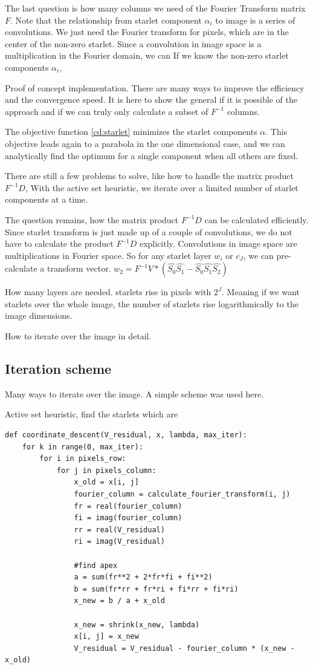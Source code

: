 The last question is how many columns we need of the Fourier Transform matrix $F$. Note that the relationship from starlet component $\alpha_i$ to image is a series of convolutions. We just need the Fourier transform for pixels, which are in the center of the non-zero starlet. Since a convolution in image space is a multiplication in the Fourier domain, we can 
If we know the non-zero starlet components $\alpha_i$, 


Proof of concept implementation. There are many ways to improve the efficiency and the convergence speed. It is here to show  the general if it is possible of the approach and if we can truly only calculate a subset of $F^{-1}$ columns.

The objective function \eqref{cd:starlet} minimizes the starlet components $\alpha$. This objective leads again to a parabola in the one dimensional case, and we can analytically find the optimum for a single component when all others are fixed. 



There are still a few problems to solve, like how to handle the matrix product $F^{-1}D$, 
With the active set heuristic, we iterate over a limited number of starlet components at a time. 

The question remains, how the matrix product $F^{-1}D$ can be calculated efficiently. Since starlet transform is just made up of a couple of convolutions, we do not have to calculate the product $F^{-1}D$ explicitly. Convolutions in image space are multiplications in Fourier space. 
So for any starlet layer $w_i$ or $c_J$, we can pre-calculate a transform vector. 
$w_2 = F^{-1}V * (\hat{S_0}\hat{S_1} - \hat{S_0}\hat{S_1}\hat{S_2})$

How many layers are needed. starlets rise in pixels with $2^J$. Meaning if we want starlets over the whole image, the number of starlets rise logarithmically to the image dimensions.

How to iterate over the image in detail.



\subsection{Iteration scheme}
Many ways to iterate over the image. A simple scheme was used here. 

Active set heuristic, find the starlets which are 

\begin{lstlisting} 
def coordinate_descent(V_residual, x, lambda, max_iter):
	for k in range(0, max_iter):
		for i in pixels_row:
			for j in pixels_column:
				x_old = x[i, j]
				fourier_column = calculate_fourier_transform(i, j)
				fr = real(fourier_column)
				fi = imag(fourier_column)
				rr = real(V_residual)
				ri = imag(V_residual)
				
				#find apex
				a = sum(fr**2 + 2*fr*fi + fi**2)
				b = sum(fr*rr + fr*ri + fi*rr + fi*ri)
				x_new = b / a + x_old
				
				x_new = shrink(x_new, lambda)
				x[i, j] = x_new
				V_residual = V_residual - fourier_column * (x_new - x_old)
\end{lstlisting}\label{cd:implementation}

